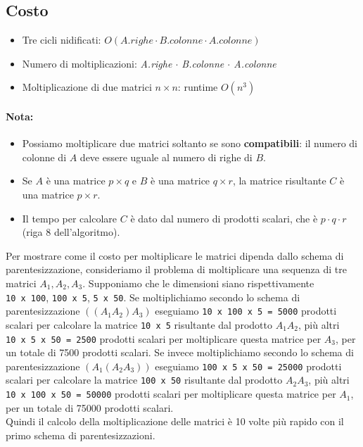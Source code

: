 \subsection{Costo}

\begin{itemize}
  \item Tre cicli nidificati: $O(A.righe \cdot B.colonne \cdot A.colonne)$
  \item Numero di moltiplicazioni: \emph{A.righe $\cdot$ B.colonne $\cdot$ A.colonne}
  \item Moltiplicazione di due matrici $n \times n$: runtime $O(n^3)$
\end{itemize}

\paragraph*{Nota:}
\begin{itemize}
  \item Possiamo moltiplicare due matrici soltanto se sono
        \textbf{compatibili}: il numero di colonne di $A$ deve essere uguale
        al numero di righe di $B$.
  \item Se $A$ è una matrice $p \times q$ e
        $B$ è una matrice $q \times r$, la matrice risultante $C$ è una
        matrice $p \times r$.
  \item Il tempo per calcolare $C$ è dato dal numero di prodotti scalari, che
        è $p \cdot q \cdot r$ (riga 8 dell'algoritmo).
\end{itemize}

Per mostrare come il costo per moltiplicare le matrici dipenda dallo
schema di parentesizzazione, consideriamo il problema di moltiplicare
una sequenza di tre matrici $A_1, A_2, A_3$. Supponiamo che le
dimensioni siano rispettivamente \texttt{10\ x\ 100},
\texttt{100\ x\ 5}, \texttt{5\ x\ 50}. Se moltiplichiamo secondo lo
schema di parentesizzazione $((A_1 A_2 )A_3)$ eseguiamo
\texttt{10\ x\ 100\ x\ 5\ =\ 5000} prodotti scalari per calcolare la
matrice \texttt{10\ x\ 5} risultante dal prodotto $A_1 A_2$, più
altri \texttt{10\ x\ 5\ x\ 50\ =\ 2500} prodotti scalari per
moltiplicare questa matrice per $A_3$, per un totale di 7500 prodotti
scalari. Se invece moltiplichiamo secondo lo schema di parentesizzazione
$(A_1 (A_2 A_3))$ eseguiamo \texttt{100\ x\ 5\ x\ 50\ =\ 25000}
prodotti scalari per calcolare la matrice \texttt{100\ x\ 50} risultante
dal prodotto $A_2 A_3$, più altri
\texttt{10\ x\ 100\ x\ 50\ =\ 50000} prodotti scalari per moltiplicare
questa matrice per $A_1$, per un totale di 75000 prodotti scalari.\\
Quindi il calcolo della moltiplicazione delle matrici è 10 volte più
rapido con il primo schema di parentesizzazioni.

